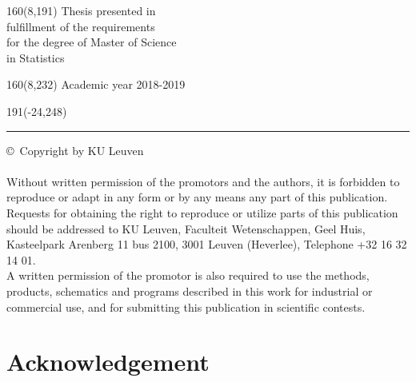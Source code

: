 \documentclass[12pt,a4paper,oneside]{book}
\newenvironment{bottompar}{\par\vspace*{\fill}}{\clearpage}
\begin{document}
%
\begin{textblock}{160}(8,191)
\textblockcolour{}
\vspace{-\parskip}
\flushright
Thesis presented in\\[4.5pt]
fulfillment of the requirements\\[4.5pt]
for the degree of Master of Science\\[4.5pt]
in Statistics\\
\end{textblock}
%
\begin{textblock}{160}(8,232)
\textblockcolour{}
\vspace{-\parskip}
\flushright
Academic year 2018-2019
\end{textblock}
%
\begin{textblock}{191}(-24,248)
{\color{blueline}\rule{550pt}{5.5pt}}
\end{textblock}
%
\vfill
\newpage


\rmfamily
\pagestyle{plain}


\newpage
\setcounter{page}{0}

\begin{bottompar}
\copyright \ Copyright by KU Leuven \\ \\
Without written permission of the promotors and the authors, it is forbidden to reproduce or adapt in any form or by any means any part of this publication. Requests for obtaining the right to reproduce or utilize parts of this publication should be addressed to KU Leuven, Faculteit Wetenschappen, Geel Huis, Kasteelpark Arenberg 11 bus 2100, 3001 Leuven (Heverlee), Telephone +32 16 32 14 01. \\
A written permission of the promotor is also required to use the methods, products, schematics and programs described in this work for industrial or commercial use, and for submitting this publication in scientific contests.
\end{bottompar}



\chapter*{Acknowledgement}
\end{document}

